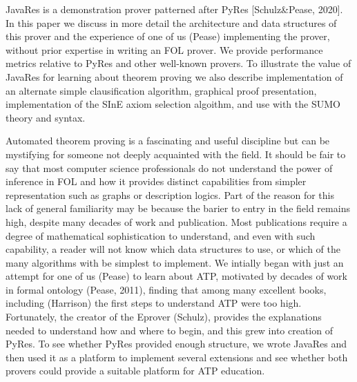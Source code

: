 JavaRes is a demonstration prover patterned after PyRes [Schulz&Pease, 2020].  In this paper we discuss in more detail the architecture and data structures of this prover and the experience of one of us (Pease) implementing the prover, without prior expertise in writing an FOL prover.  We provide performance metrics relative to PyRes and other well-known provers.  To illustrate the value of JavaRes for learning about theorem proving we also describe implementation of an alternate simple clausification algorithm, graphical proof presentation, implementation of the SInE axiom selection algoithm, and use with the SUMO theory and syntax.

Automated theorem proving is a fascinating and useful discipline but can be mystifying for someone not deeply acquainted with the field.  It should be fair to say that most computer science professionals do not understand the power of inference in FOL and how it provides distinct capabilities from simpler representation such as graphs or description logics.  Part of the reason for this lack of general familiarity may be because the barier to entry in the field remains high, despite many decades of work and publication.  Most publications require a degree of mathematical sophistication to understand, and even with such capability, a reader will not know which data structures to use, or which of the many algorithms with be simplest to implement.
  We intially began with just an attempt for one of us (Pease) to learn about ATP, motivated by decades of work in formal ontology (Pease, 2011), finding that among many excellent books, including (Harrison) the first steps to understand ATP were too high.  Fortunately, the creator of the Eprover (Schulz), provides the explanations needed to understand how and where to begin, and this grew into creation of PyRes.  To see whether PyRes provided enough structure, we wrote JavaRes and then used it as a platform to implement several extensions and see whether both provers could provide a suitable platform for ATP education.
